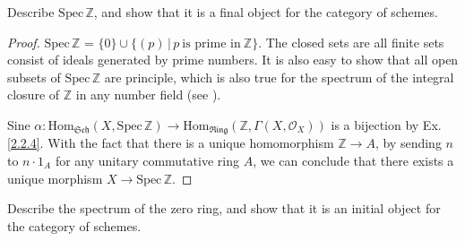 \begin{exe}
	\label{2.2.5}
	Describe $\mathrm{Spec}\,\mathbb{Z}$, and show that it is a final object for the category of schemes.
\end{exe}

\begin{proof}
	$\mathrm{Spec}\,\mathbb{Z}$ = $\{0\} \cup \{ (p)\,|\,p\ \text{is prime in}\ \mathbb{Z}\}$. The closed sets are all finite sets consist of ideals generated by prime numbers. It is also easy to show that all open subsets of $\mathrm{Spec}\,\mathbb{Z}$ are principle, which is also true for the spectrum of the integral closure of $\mathbb{Z}$ in any number field (see \cite[Ch. 2, Ex. 3.19, P. 58]{LIU}).
	
	Sine $\alpha : \mathrm{Hom}_{\mathfrak{Sch}}(X, \mathrm{Spec}\,\mathbb{Z}) \to \mathrm{Hom}_{\mathfrak{Ring}}(\mathbb{Z}, \Gamma(X, \mathcal{O}_{X}))$ is a bijection by Ex. \ref{2.2.4}. With the fact that there is a unique homomorphism $\mathbb{Z}\to A$, by sending $n$ to $n\cdot1_{A}$ for any unitary commutative ring $A$, we can conclude that there exists a unique morphism $X \to \mathrm{Spec}\,\mathbb{Z}$.
\end{proof}

\begin{exe}
	\label{2.2.6}
	Describe the spectrum of the zero ring, and show that it is an initial object for the category of schemes.
\end{exe}

